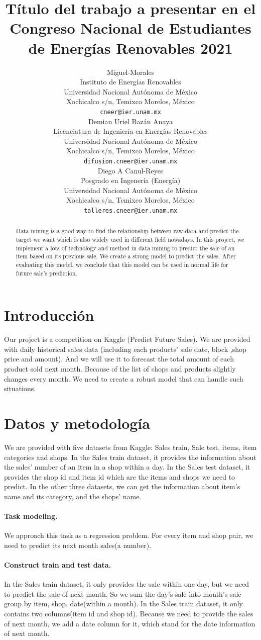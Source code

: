 \documentclass{article}
\title{Título del trabajo a presentar en el Congreso Nacional de Estudiantes de Energías Renovables 2021}
\date{} 					%
\author{
 Miguel-Morales \\
  Instituto de Energías Renovables\\
  Universidad Nacional Autónoma de México\\
  Xochicalco s/n, Temixco Morelos, México \\
  \texttt{cneer@ier.unam.mx} \\
   \And
 Demian Uriel Bazán Anaya \\
  Licenciatura de Ingeniería en Energías Renovables\\
  Universidad Nacional Autónoma de México\\
  Xochicalco s/n, Temixco Morelos, México \\
  \texttt{difusion.cneer@ier.unam.mx} \\
  \And
 Diego A Canul-Reyes \\
  Posgrado en Ingenería (Energía)\\
  Universidad Nacional Autónoma de México\\
  Xochicalco s/n, Temixco Morelos, México \\
  \texttt{talleres.cneer@ier.unam.mx} \\
}
\begin{document}
\maketitle


\begin{abstract}
Data mining is a good way to find the relationship between raw data and predict the target we want which is also widely used in different field nowadays. In this project, we implement a lots of technology and method in data mining to predict the sale of an item based on its previous sale. We create a strong model to predict the sales. After evaluating this model, we conclude that this model can be used in normal life for future sale’s prediction. 
\end{abstract}




\section{Introducción}
Our project is a competition on Kaggle (Predict Future Sales). We are provided with daily historical sales data (including each products’ sale date, block ,shop price and amount). And we will use it to forecast the total amount of each product sold next month. Because of the list of shops and products slightly changes every month. We need to create a robust model that can handle such situations.


\section{Datos y metodología}
\label{sec:headings}
We are provided with five datasets from Kaggle: Sales train, Sale test, items, item categories and shops. In the Sales train dataset, it provides the information about the sales’ number of an item in a shop within a day. In the Sales test dataset, it provides the shop id and item id which are the items and shops we need to predict. In the other three datasets, we can get the information about item’s name and its category, and the shops’ name.
\paragraph{Task modeling.}
We approach this task as a regression problem. For every item and shop pair, we need to predict its next month sales(a number).
\paragraph{Construct train and test data.}
In the Sales train dataset, it only provides the sale within one day, but we need to predict the sale of next month. So we sum the day's sale into month's sale group by item, shop, date(within a month).
In the Sales train dataset, it only contains two columns(item id and shop id). Because we need to provide the sales of next month, we add a date column for it, which stand for the date information of next month.
\end{document}
